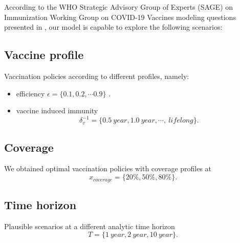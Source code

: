 According to the WHO Strategic Advisory Group of Experts (SAGE) on
Immunization Working Group on COVID-19 Vaccines modeling questions
presented in \cite{sage2020}, our model is capable to explore the following scenarios:
    \subsection*{Vaccine profile}
    Vaccination policies according to different profiles, namely:
    \begin{itemize}
      \item
          efficiency
          $\epsilon = \{\num{0.1}, \num{0.2}, \cdots  \num{0.9} \}$ .
      \item
        vaccine induced immunity
        $$
          \delta_v ^{-1}=
            \{\SI{0.5}{year},
              \SI{1.0}{year}, \cdots, \SI{}{lifelong}
            \}.
        $$
    \end{itemize}


  \subsection*{Coverage}
    We obtained optimal vaccination policies with coverage profiles at
    $$
      x_{coverage} =
        \{
          20\%, 50\%, 80\%
        \}.
    $$
  \subsection*{Time horizon}
  Plausible scenarios at a different analytic time horizon
  $$
    T= \{ \SI{1}{year}, \SI{2}{year}, \SI{10}{year} \}.
  $$


